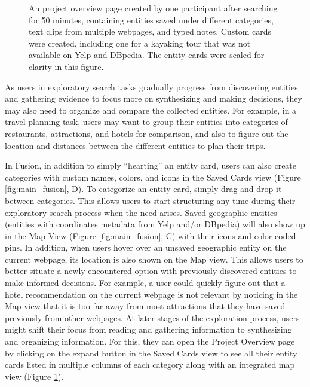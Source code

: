 \begin{figure}
    \centering
    \caption[An project overview page created by one participant.]{An project overview page created by one participant after searching for 50 minutes, containing entities saved under different categories, text clips from multiple webpages, and typed notes. Custom cards were created, including one for a kayaking tour that was not available on Yelp and DBpedia. The entity cards were scaled for clarity in this figure.}
    \label{fig:project_fusion}
\end{figure}


As users in exploratory search tasks gradually progress from discovering entities and gathering evidence to focus more on synthesizing and making decisions, they may also need to organize and compare the collected entities. For example, in a travel planning task, users may want to group their entities into categories of restaurants, attractions, and hotels for comparison, and also to figure out the location and distances between the different entities to plan their trips.

In Fusion, in addition to simply ``hearting'' an entity card, users can also create categories with custom names, colors, and icons in the Saved Cards view (Figure \ref{fig:main_fusion}, D). To categorize an entity card, simply drag and drop it between categories. This allows users to start structuring any time during their exploratory search process when the need arises. Saved geographic entities (entities with coordinates metadata from Yelp and/or DBpedia) will also show up in the Map View  (Figure \ref{fig:main_fusion}, C) with their icons and color coded pins. In addition, when users hover over an unsaved geographic entity on the current webpage, its location is also shown on the Map view. This allows users to better situate a newly encountered option with previously discovered entities to make informed decisions. For example, a user could quickly figure out that a hotel recommendation on the current webpage is not relevant by noticing in the Map view that it is too far away from most attractions that they have saved previously from other webpages. At later stages of the exploration process, users might shift their focus from reading and gathering information to synthesizing and organizing information. For this, they can open the Project Overview page by clicking on the expand button in the Saved Cards view to see all their entity cards listed in multiple columns of each category along with an integrated map view (Figure \ref{fig:project_fusion}).

